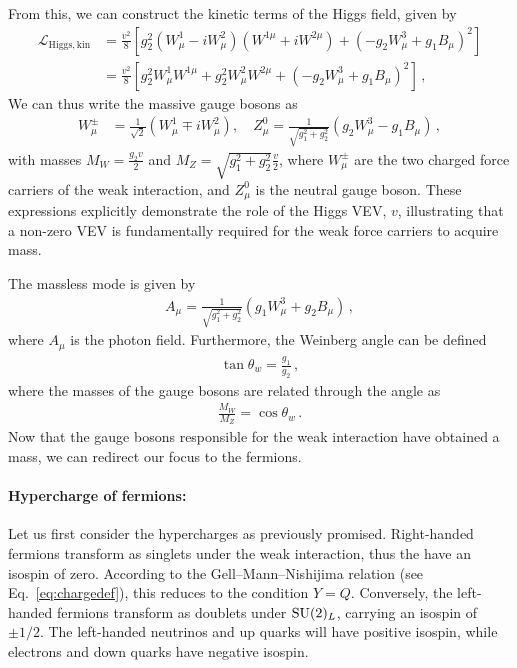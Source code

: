 From this, we can construct the kinetic terms of the Higgs field, given by
\begin{align}
\mathcal{L}_{\mathrm{Higgs, kin}} &= \frac{v^2}{8} \left[ g_2^2 (W_\mu^1 - i W_\mu^2)(W^{1\mu} + i W^{2\mu}) + (-g_2 W_\mu^3 + g_1 B_\mu)^2 \right] \nonumber\\
&= \frac{v^2}{8} \left[ g_2^2 W_\mu^1 W^{1\mu} + g_2^2 W_\mu^2 W^{2\mu} + (-g_2 W_\mu^3 + g_1 B_\mu)^2 \right]\,,
\end{align}
We can thus write the massive gauge bosons as \cite{Peskin:1995ev}
\begin{align}
    W_\mu^\pm &= \frac{1}{\sqrt{2}} (W_\mu^1 \mp iW_\mu^2), \quad Z_\mu^0 = \frac{1}{\sqrt{g_1^2 + g_2^2}} (g_2 W_\mu^3 - g_1 B_\mu)\,,
\end{align}
with masses $M_W= \frac{g_2 v}{2}$ and $M_Z = \sqrt{g_1^2 + g_2^2} \frac{v}{2}$, where $W^{\pm}_\mu$ are the two charged force carriers of the weak interaction, and $Z^0_\mu$ is the neutral gauge boson. These expressions explicitly demonstrate the role of the Higgs VEV, $v$, illustrating that a non-zero VEV is fundamentally required for the weak force carriers to acquire mass. 

The massless mode is given by 
\begin{align}
    A_\mu = \frac{1}{\sqrt{g_1^2 + g_2^2}} (g_1 W_\mu^3 + g_2 B_\mu)\,,
\end{align}
where $A_\mu$ is the photon field.
Furthermore, the Weinberg angle \cite{Pernow:2021fvb} can be defined 
\begin{align}
    \tan\theta_w=\frac{g_1}{g_2}\,,
\end{align}
where the masses of the gauge bosons are related through the angle as \cite{Peskin:1995ev}
\begin{align}
    \frac{M_W}{M_Z}=\cos\theta_w\,.
\end{align}
Now that the gauge bosons responsible for the weak interaction have obtained a mass, we can redirect our focus to the fermions.

\paragraph{Hypercharge of fermions: }Let us first consider the hypercharges as previously promised. Right-handed fermions transform as singlets under the weak interaction, thus the have an isospin of zero. According to the Gell--Mann--Nishijima relation (see Eq.~\eqref{eq:chargedef}), this reduces to the condition $Y=Q$. Conversely, the left-handed fermions transform as doublets under $\mathrm{SU}(2)_L$, carrying an isospin of $\pm1/2$. The left-handed neutrinos and up quarks will have positive isospin, while electrons and down quarks have negative isospin.  

